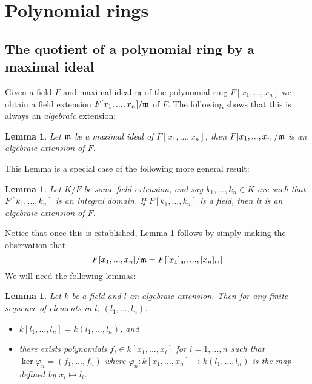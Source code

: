 \documentclass[12pt]{article}
\theoremstyle{plain}
\newtheorem{lemma}[thm]{Lemma}
\theoremstyle{definition}
\begin{document}
\section{Polynomial rings}
\subsection{The quotient of a polynomial ring by a maximal ideal}
\label{subsec:quotient_polynomial}
Given a field $F$ and maximal ideal $\frak{m}$ of the polynomial ring $F[x_1,...,x_n]$ we obtain a field extension $F[x_1,...,x_n]/\frak{m}$ of $F$. The following shows that this is always an \emph{algebraic} extension:
\begin{lemma}
\label{lem:algebraic}
Let $\frak{m}$ be a maximal ideal of $F[x_1,...,x_n]$, then $F[x_1,...,x_n]/\frak{m}$ is an algebraic extension of $F$.
\end{lemma}
This Lemma is a special case of the following more general result:
\begin{lemma}
\label{converse}
Let $K/F$ be some field extension, and say $k_1,...,k_n \in K$ are such that $F[k_1,...,k_n]$ is an integral domain. If $F[k_1,...,k_n]$ is a field, then it is an algebraic extension of $F$.
\end{lemma}
Notice that once this is established, Lemma \ref{lem:algebraic} follows by simply making the observation that $$F[x_1,...,x_n]/\frak{m} = F[[x_1]_{\frak{m}},...,[x_n]_{\frak{m}}]$$
We will need the following lemmas:
\begin{lemma}
\label{lem:extension}
Let $k$ be a field and $l$ an algebraic extension. Then for any finite sequence of elements in $l$, $(l_1,...,l_n)$:
\begin{itemize}
    \item $k[l_1,...,l_n] = k(l_1,...,l_n)$, and
    \item there exists polynomials $f_i \in k[x_1,...,x_i]$ for $i= 1,...,n$ such that $\operatorname{ker}\varphi_n = (f_1,...,f_n)$ where $\varphi_n: k[x_1,...,x_n] \to k(l_1,...,l_n)$ is the map defined by $x_i \mapsto l_i$.
\end{itemize}
\end{lemma}
\end{document}
